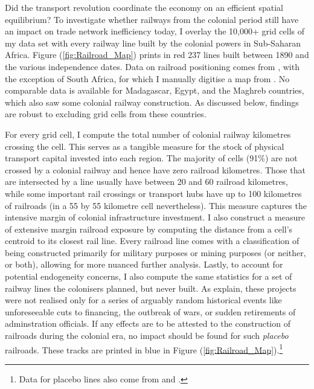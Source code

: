 \documentclass[11pt, oneside]{article}   	%
\let\oldref\ref
\renewcommand{\ref}[1]{(\oldref{#1})}
\begin{document}
Did the transport revolution coordinate the economy on an efficient spatial equilibrium? To investigate whether railways from the colonial period still have an impact on trade network inefficiency today, I overlay the 10,000+ grid cells of my data set with every railway line built by the colonial powers in Sub-Saharan Africa. Figure \ref{fig:Railroad_Map} prints in red 237 lines built between 1890 and the various independence dates. Data on railroad positioning comes from \cite{jedwab_permanent_2016}, with the exception of South Africa, for which I manually digitise a map from \cite{Herranz-Loncan_publicbenefitRailways_2017}. No comparable data is available for Madagascar, Egypt, and the Maghreb countries, which also saw some colonial railway construction. As discussed below, findings are robust to excluding grid cells from these countries.

For every grid cell, I compute the total number of colonial railway kilometres crossing the cell. This serves as a tangible measure for the stock of physical transport capital invested into each region. The majority of cells (91\%) are not crossed by a colonial railway and hence have zero railroad kilometres. Those that are intersected by a line usually have between 20 and 60 railroad kilometres, while some important rail crossings or transport hubs have up to 100 kilometres of railroads (in a 55 by 55 kilometre cell nevertheless). This measure captures the intensive margin of colonial infrastructure investment. I also construct a measure of extensive margin railroad exposure by computing the distance from a cell's centroid to its closest rail line. Every railroad line comes with a classification of being constructed primarily for military purposes or mining purposes (or neither, or both), allowing for more nuanced further analysis. Lastly, to account for potential endogeneity concerns, I also compute the same statistics for a set of railway lines the colonisers planned, but never built. As \cite{jedwab_permanent_2016} explain, these projects were not realised only for a series of arguably random historical events like unforeseeable cuts to financing, the outbreak of wars, or sudden retirements of adminstration officials. If any effects are to be attested to the construction of railroads during the colonial era, no impact should be found for such \emph{placebo} railroads. These tracks are printed in blue in Figure \ref{fig:Railroad_Map}.\footnote{Data for placebo lines also come from \cite{jedwab_permanent_2016} and \cite{Herranz-Loncan_publicbenefitRailways_2017}.}
\end{document}
